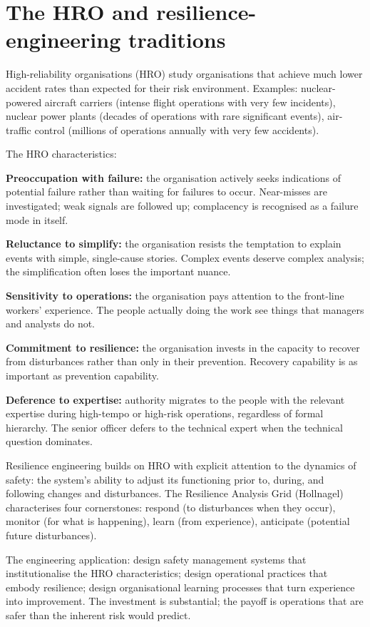 \section{The HRO and resilience-engineering traditions}

High-reliability organisations (HRO) study organisations that achieve much lower accident rates than expected for their risk environment. Examples: nuclear-powered aircraft carriers (intense flight operations with very few incidents), nuclear power plants (decades of operations with rare significant events), air-traffic control (millions of operations annually with very few accidents).

The HRO characteristics:

\textbf{Preoccupation with failure:} the organisation actively seeks indications of potential failure rather than waiting for failures to occur. Near-misses are investigated; weak signals are followed up; complacency is recognised as a failure mode in itself.

\textbf{Reluctance to simplify:} the organisation resists the temptation to explain events with simple, single-cause stories. Complex events deserve complex analysis; the simplification often loses the important nuance.

\textbf{Sensitivity to operations:} the organisation pays attention to the front-line workers' experience. The people actually doing the work see things that managers and analysts do not.

\textbf{Commitment to resilience:} the organisation invests in the capacity to recover from disturbances rather than only in their prevention. Recovery capability is as important as prevention capability.

\textbf{Deference to expertise:} authority migrates to the people with the relevant expertise during high-tempo or high-risk operations, regardless of formal hierarchy. The senior officer defers to the technical expert when the technical question dominates.

Resilience engineering builds on HRO with explicit attention to the dynamics of safety: the system's ability to adjust its functioning prior to, during, and following changes and disturbances. The Resilience Analysis Grid (Hollnagel) characterises four cornerstones: respond (to disturbances when they occur), monitor (for what is happening), learn (from experience), anticipate (potential future disturbances).

The engineering application: design safety management systems that institutionalise the HRO characteristics; design operational practices that embody resilience; design organisational learning processes that turn experience into improvement. The investment is substantial; the payoff is operations that are safer than the inherent risk would predict.

